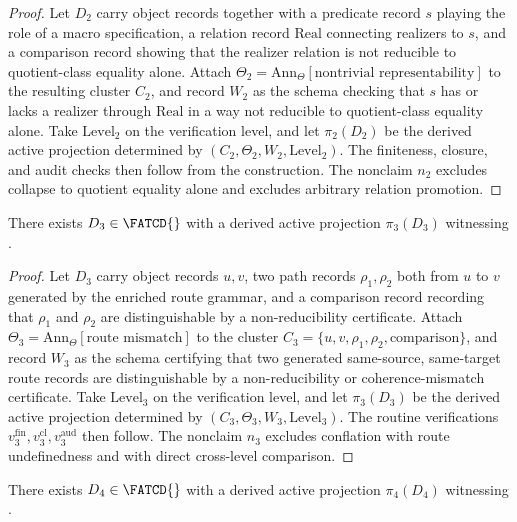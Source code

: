 \begin{proof}
Let \(D_2\) carry object records together with a predicate record \(s\)
playing the role of a macro specification, a relation record
\(\mathrm{Real}\) connecting realizers to \(s\), and a comparison
record showing that the realizer relation is not reducible to
quotient-class equality alone. Attach
\(\Theta_2 = \mathrm{Ann}_\Theta[\text{nontrivial representability}]\)
to the resulting cluster \(C_2\), and record \(W_2\) as the schema
checking that \(s\) has or lacks a realizer through \(\mathrm{Real}\) in
a way not reducible to quotient-class equality alone. Take
\(\mathrm{Level}_2\) on the verification level, and let \(\pi_2(D_2)\)
be the derived active projection determined by
\((C_2,\Theta_2,W_2,\mathrm{Level}_2)\). The finiteness, closure, and
audit checks then follow from the construction. The
nonclaim \(n_2\) excludes collapse to \Pfive{} quotient equality alone
and excludes arbitrary relation promotion.
\end{proof}

\begin{proposition}\label{prop:p3-witness}
There exists \(D_3 \in \FATCD{}\) with a derived active projection
\(\pi_3(D_3)\) witnessing \Pthree{}.
\end{proposition}

\begin{proof}
Let \(D_3\) carry object records \(u, v\), two path records
\(\rho_1, \rho_2\) both from \(u\) to \(v\) generated by the enriched
route grammar, and a comparison record recording that \(\rho_1\) and
\(\rho_2\) are distinguishable by a non-reducibility certificate.
Attach \(\Theta_3 = \mathrm{Ann}_\Theta[\text{route mismatch}]\) to the
cluster \(C_3 = \{u, v, \rho_1, \rho_2, \text{comparison}\}\), and
record \(W_3\) as the schema certifying that two generated same-source,
same-target route records are distinguishable by a non-reducibility or
coherence-mismatch certificate. Take \(\mathrm{Level}_3\) on the
verification level, and let \(\pi_3(D_3)\) be the derived active
projection determined by
\((C_3,\Theta_3,W_3,\mathrm{Level}_3)\). The routine verifications
\(v_3^{\mathrm{fin}}, v_3^{\mathrm{cl}}, v_3^{\mathrm{aud}}\) then
follow. The nonclaim \(n_3\) excludes conflation with
\Pone{} route undefinedness and with direct cross-level comparison.
\end{proof}

\begin{proposition}\label{prop:p4-witness}
There exists \(D_4 \in \FATCD{}\) with a derived active projection
\(\pi_4(D_4)\) witnessing \Pfour{}.
\end{proposition}

